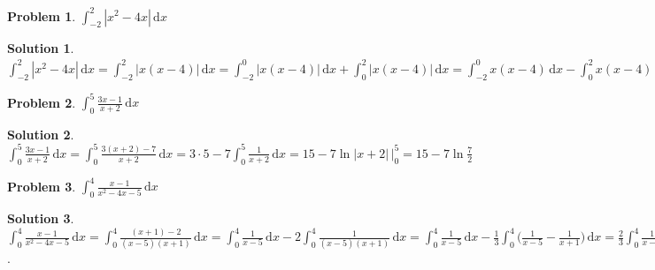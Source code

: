 \documentclass[11pt,a4paper]{article}
\newcommand{\ds}{\displaystyle}
\theoremstyle{definition}
\newtheorem*{problem}{Problem}
\newtheorem*{solution}{Solution}
\begin{document}
%
%

\begin{problem}
  $\ds\int_{-2}^2\!|x^2 - 4x|\,\text{d}x$
\end{problem}

\begin{solution}
  $\ds\int_{-2}^2\!|x^2 - 4x|\,\text{d}x = \int_{-2}^2\!|x(x - 4)|\,\text{d}x = \int_{-2}^0 |x(x - 4)|\,\text{d}x + \int_0^2 |x(x - 4)|\,\text{d}x = \int_{-2}^0 x(x - 4)\,\text{d}x - \int_0^2 x(x - 4)\,\text{d}x = \int_{-2}^0(x^2 - 4x)\,\text{d}x + \int_0^2(4x - x^2)\,\text{d}x = \int_{-2}^0(x^2 - 4x)\,\text{d}x + \int_0^2(4x - x^2)\,\text{d}x = \Big(\frac{x^3}{3} - 2x^2\Big)\,\Big|_{-2}^0 + \Big(2x^2 - \frac{x^3}{3}\Big)\,\Big|_0^2 = 0 - \Big(\frac{(-2)^3}{3} - 2(-2)^2\Big) + \Big(2\cdot2^2 - \frac{2^3}{3}\Big) = 16$
\end{solution}

\begin{problem}
  $\ds\int_0^5\frac{3 x - 1}{x + 2}\,\text{d}x$
\end{problem}

\begin{solution}
  $\ds\int_0^5\frac{3 x - 1}{x + 2}\,\text{d}x = \int_0^5\frac{3(x + 2) - 7}{x + 2}\,\text{d}x = 3\cdot 5 - 7\int_0^5\frac{1}{x + 2}\,\text{d}x = 15 - 7\ln|x + 2|\,\Big|_0^5 = 15 - 7\ln\frac{7}{2}$
\end{solution}

\begin{problem}
  $\ds\int_0^4\!\frac{x-1}{x^2-4x-5}\,\text{d}x$
\end{problem}

\begin{solution}
  $\ds\int_0^4\!\frac{x-1}{x^2-4x-5}\,\text{d}x = \int_0^4\!\frac{(x + 1) - 2}{(x - 5)(x + 1)}\,\text{d}x = \int_0^4\!\frac{1}{x - 5}\,\text{d}x - 2\int_0^4\!\frac{1}{(x - 5)(x + 1)}\,\text{d}x = \int_0^4\!\frac{1}{x - 5}\,\text{d}x - \frac{1}{3}\int_0^4\!\bigg(\frac{1}{x - 5} - \frac{1}{x + 1}\bigg)\,\text{d}x = \frac{2}{3}\int_0^4\!\frac{1}{x - 5}\,\text{d}x + \frac{1}{3}\int_0^4\!\frac{1}{x + 1}\,\text{d}x = \frac{2}{3}\ln|x - 5|\,\Big|_0^4 + \frac{1}{3}\ln|x + 1|\,\Big|_0^4 = -\frac{2}{3}\ln 5 + \frac{1}{3}\ln 5 = -\frac{1}{3}\ln 5$.
\end{solution}
\end{document}
